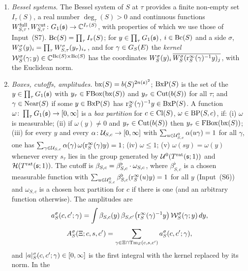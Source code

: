 \documentclass[11pt,a4paper]{article}
\theoremstyle{plainx}
\theoremstyle{uprightx}
\newcommand{\Wsys}[3]{W^{#1}_{#2,#3}}                      %
\newcommand{\Isys}[2]{I_{#2}(#1)}                          %
\newcommand{\cj}[1]{\overline{#1}}
\newcommand{\omS}[2]{\omega_{#1,#2}}                       %
\newcommand{\bfl}[2]{\beta^{\flat}_{#1,#2}}                %
\begin{document}
\begin{enumerate}[label=(R\arabic*),leftmargin=3.1em,itemsep=3pt]
integral left inverse, and $\sld{H}{V}=\sqrt{\gix{\det(\slb{H}{V}^{*}\slb{H}{V})}}$. Finally
$\cw{S}{i}=\#\redim{S}{\ST{\Tlat{S}{\AEf}}}\cdot\#\Cl{S}\cdot\NS{S}^{-\kk{\fs}\ninf{E}}\,(2\,\tailS{S}^2)^{i}$.
\item\label{r:bessel} \emph{Bessel systems.} The Bessel system of $S$ at $\tau$ provides a finite non-empty set
$\Isys{S}{\tau}$, a real number $\deg_\tau(S)>0$ and continuous functions
$\Wsys{\full}{S}{\tau},\Wsys{\cut}{S}{\tau}\colon\Gone{\fs}\to\CC^{\Isys{S}{\tau}}$, with properties of which we
use those of Input~(S7). $\Bc{S}=\prod_\tau\Isys{S}{\tau}$; for $y\in\prod_\tau G_{1}(\mathfrak{s})$, $i\in\mathrm{Bc}(S)$ and a side
$\sigma$, $\besfn{\sigma}{S}{y}{i}=\prod_\tau\Wsys{\sigma}{S}{\tau}(y_\tau)_{i_\tau}$, and for $\gamma\in G_{S}(E)$ the
\emph{kernel} $\mathcal{W}^{\sigma}_{S}(\gamma;y)\in\mathbb{C}^{\mathrm{Bc}(S)\times\mathrm{Bc}(S)}$ has the coordinates
$\besfn{\sigma}{S}{y}{i}\,\cj{\besfn{\sigma}{S}{\rinf{S}(\gamma)^{-1}y}{j}}$, with the Euclidean norm.
\item\label{r:cutoff} \emph{Boxes, cutoffs, amplitudes.} $\operatorname{bx}(S)=b(S)^{2n(\mathfrak{s})^2}$; $\operatorname{BxP}(S)$ is the set of
the $y\in\prod_\tau G_{1}(\mathfrak{s})$ with $y_\tau\in\operatorname{FBox}(\operatorname{bx}(S))$ and $y_\tau\in\operatorname{Cut}(b(S))$ for all $\tau$; and
$\gamma\in\operatorname{Near}(S)$ if some $y\in\operatorname{BxP}(S)$ has $\mathrm{r}^{\infty}_{S}(\gamma)^{-1}y\in\operatorname{BxP}(S)$. A function
$\omega\colon\prod_\tau G_{1}(\mathfrak{s})\to[0,\infty]$ is a \emph{box partition} for $c\in\mathrm{Cl}(S)$, $\omega\in\operatorname{BP}(S,c)$, if:
(i) $\omega$ is measurable; (ii) if $\omega(y)\ne0$ and $y_\tau\in\operatorname{Cut}(b(S))$ then $y_\tau\in\operatorname{FBox}(\operatorname{bx}(S))$;
(iii) for every $y$ and every $\alpha\colon\mathcal{U}_{S,c}\to[0,\infty]$ with
$\sum_{u\in\mathcal{U}^{0}_{S,c}}\alpha(u\gamma)=1$ for all $\gamma$, one has
$\sum_{\gamma\in\mathcal{U}_{S,c}}\alpha(\gamma)\,\omega(\mathrm{r}^{\infty}_{S}(\gamma)y)=1$; (iv) $\omega\le1$; (v) $\omega(sy)=\omega(y)$
whenever every $s_\tau$ lies in the group generated by $\mathcal{U}^{0}(T^{\mathrm{rat}}(\mathfrak{s};1))$ and $\mathcal{H}(T^{\mathrm{rat}}(\mathfrak{s};1))$. The cutoff is
$\cutoff{S}{c}=\bfl{S}{c}\cdot\omS{S}{c}$, where $\bfl{S}{c}$ is a chosen measurable function with
$\sum_{u\in\clUo{S}{c}}\bfl{S}{c}(\rinf{S}(u)y)=1$ for all $y$ (Input~(S6)) and $\omS{S}{c}$ is a chosen box
partition for $c$ if there is one (and an arbitrary function otherwise). The amplitudes are
\[a^{\sigma}_{S}(c,c';\gamma)=\int\beta_{S,c}(y)\,\beta_{S,c'}\bigl(\mathrm{r}^{\infty}_{S}(\gamma)^{-1}y\bigr)\,\mathcal{W}^{\sigma}_{S}(\gamma;y)\,dy,\]
\[A^{\sigma}_{S}(\Xi;c,s,c')=\sum_{\gamma\in\Xi\cap\mathrm{Tm}_{S}(c,s,c')}a^{\sigma}_{S}(c,c';\gamma),\]
and $|a|^{\sigma}_{S}(c,c';\gamma)\in[0,\infty]$ is the first integral with the kernel replaced by its norm. In the

\end{enumerate}
\end{document}
